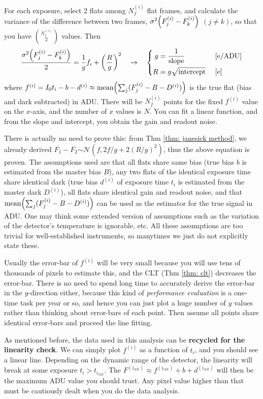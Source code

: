 \begin{thm}
For each exposure, select 2 flats among $  N^{(i)}_f $ flat frames, and calculate the variance of the difference between two frames, $ \sigma^2 \qty({F^{(i)}_j - F^{(i)}_k}) $ $ (j \neq k) $, so that you have $ \binom{N_f^{(i)}}{2} $ values. Then
\begin{equation}
  \frac{\sigma^2 \qty({F^{(i)}_j - F^{(i)}_k})}{2}
    = \frac{1}{g} f_i + \qty(\frac{R}{g})^2
  \quad\rightarrow\quad
  \left \{
  \begin{aligned}
    g &= \frac{1}{\mathrm{slope}} &&~\mathrm{[e/ADU]} \\
    R &= g \sqrt{\mathrm{intercept}} &&~\mathrm{[e]}
  \end{aligned}
  \right .
\end{equation}
where $ f^{(i)} = I_0t_i - b - d^{(i)} \approx \mathrm{mean} \qty( \sum_j (F^{(i)}_j - B - D^{(i)}) ) $ is the true flat (bias and dark subtracted) in ADU. There will be $  N^{(i)}_f $ points for the fixed $ f^{(i)} $ value on the $ x $-axis, and the number of $ x $ values is $ N $. You can fit a linear function, and from the slope and intercept, you obtain the gain and readout noise.
\end{thm}
There is actually no need to prove this: from Thm \ref{thm: janesick method}, we already derived $ F_1 - F_2 \mathrel{\dot{\sim}} \mathcal{N} (f, 2f/g + 2(R/g)^2) $, thus the above equation is proven. The assumptions used are that all flats share same bias (true bias $ b $ is estimated from the master bias $ B $), any two flats of the identical exposure time share identical dark (true bias $ d^{(i)} $ of exposure time $ t_i $ is estimated from the master dark $ D^{(i)} $), all flats share identical gain and readout noise, and that $ \mathrm{mean} \qty( \sum_j (F^{(i)}_j - B - D^{(i)}) ) $ can be used as the estimator for the true signal in ADU. One may think some extended version of assumptions such as the variation of the detector's temperature is ignorable, etc. All these assumptions are too trivial for well-established instruments, so manytimes we just do not explicitly state these.

Usually the error-bar of $ f^{(i)} $ will be very small because you will use tens of thousands of pixels to estimate this, and the CLT (Thm \ref{thm: clt}) decreases the error-bar. There is no need to spend long time to accurately derive the error-bar in the $ y $-direction either, because this kind of \textit{performance evaluation} is a one-time task per year or so, and hence you can just plot a huge number of $ y $ values rather than thinking about error-bars of each point. Then assume all points share identical error-bars and proceed the line fitting.

As mentioned before, the data used in this analysis can be \textbf{recycled for the linearity check}. We can simply plot $ f^{(i)} $ as a function of $ t_i $, and you should see a linear line. Depending on the dynamic range of the detector, the linearity will break at some exposure $ t_i > t_{i_\mathrm{crit}} $. The $ F^{(i_\mathrm{crit})} \approx f^{(i_\mathrm{crit})} + b + d^{(i_\mathrm{crit})} $ will then be the maximum ADU value you should trust. Any pixel value higher than that must be cautiously dealt when you do the data analysis.